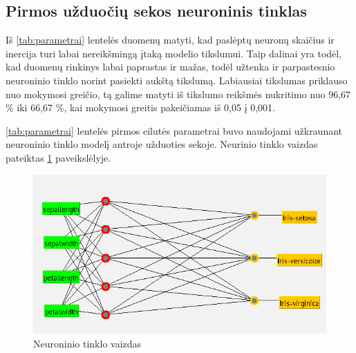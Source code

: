 \documentclass{VUMIFPSbakalaurinis}
\begin{document}
\subsection{Pirmos užduočių sekos neuroninis tinklas}
Iš \ref{tab:parametrai} lentelės duomenų matyti, kad paslėptų
neuronų skaičius ir inercija turi labai nereikšmingą įtaką
modelio tikslumui. Taip dalinai yra todėl, kad 
duomenų rinkinys labai paprastas ir mažas, todėl užtenka
ir parpastesnio neuroninio tinklo norint pasiekti aukštą tikslumą.
Labiausiai tikslumas priklauso nuo mokymosi greičio, tą galime
matyti iš tikslumo reikšmės nukritimo nuo 96,67 \% iki 66,67 \%,
kai mokymosi greitis pakeičiamas iš 0,05 į 0,001. 

\ref{tab:parametrai} lentelės pirmos eilutės parametrai
buvo naudojami užkraunant neuroninio tinklo modelį antroje
užduoties sekoje. Neurinio tinklo vaizdas 
pateiktas \ref{img:tinklas} paveikslėlyje.

\begin{figure}[H]
  \centering
  \includegraphics[scale=0.5]{img/tinklas.png}
  \caption{Neuroninio tinklo vaizdas}
  \label{img:tinklas}
\end{figure}
\end{document}
